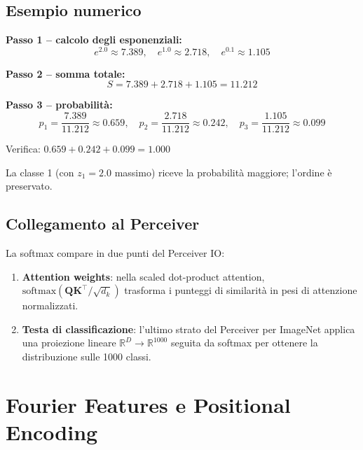 \documentclass[
  11pt,
]{article}
\begin{document}
\subsection{Esempio numerico}

\begin{notabox}[title={\textbf{Esempio: $\mathbf{z} = [2.0,\; 1.0,\; 0.1]$}}]
\textbf{Passo 1 -- calcolo degli esponenziali:}
\[
e^{2.0} \approx 7.389, \quad e^{1.0} \approx 2.718, \quad e^{0.1} \approx 1.105
\]

\textbf{Passo 2 -- somma totale:}
\[
S = 7.389 + 2.718 + 1.105 = 11.212
\]

\textbf{Passo 3 -- probabilità:}
\[
p_1 = \frac{7.389}{11.212} \approx 0.659, \quad
p_2 = \frac{2.718}{11.212} \approx 0.242, \quad
p_3 = \frac{1.105}{11.212} \approx 0.099
\]

Verifica: $0.659 + 0.242 + 0.099 = 1.000$ \checkmark

La classe 1 (con $z_1 = 2.0$ massimo) riceve la probabilità maggiore; l'ordine è preservato.
\end{notabox}

\subsection{Collegamento al Perceiver}

\begin{notabox}[title={\textbf{Softmax nel Perceiver}}]
La softmax compare in due punti del Perceiver IO:
\begin{enumerate}
  \item \textbf{Attention weights}: nella scaled dot-product attention, $\text{softmax}(\mathbf{Q}\mathbf{K}^\top/\sqrt{d_k})$ trasforma i punteggi di similarità in pesi di attenzione normalizzati.
  \item \textbf{Testa di classificazione}: l'ultimo strato del Perceiver per ImageNet applica una proiezione lineare $\mathbb{R}^D \to \mathbb{R}^{1000}$ seguita da softmax per ottenere la distribuzione sulle 1000 classi.
\end{enumerate}
\end{notabox}

\section{Fourier Features e Positional Encoding}
\label{app:fourier-theory}
\end{document}
